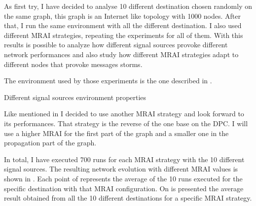 As first try, I have decided to analyse \num{10} different destination chosen randomly
on the same graph, this graph is an Internet like topology with \num{1000} nodes.
After that, I run the same environment with all the different destination.
I also used different \ac{MRAI} strategies, repeating the experiments for all of
them.
With this results is possible to analyze how different signal sources provoke
different network performances and also study how different \ac{MRAI} strategies
adapt to different nodes that provoke messages storms.

The environment used by those experiments is the one described in
.

\begin{table}[h]
	
	\caption{Different signal sources environment properties}
	\label{tbl:source_properties}
\end{table}

Like mentioned in  I decided to use another
\ac{MRAI} strategy and look forward to its performances.
That strategy is the reverse of the one base on the \ac{DPC}.
I will use a higher \ac{MRAI} for the first part of the graph and a smaller
one in the propagation part of the graph.

In total, I have executed \num{700} runs for each \ac{MRAI} strategy with the
\num{10} different signal sources.
The resulting network evolution with different \ac{MRAI} values is shown in
.
Each point of  represents the average
of the \num{10} runs executed for the specific destination with that \ac{MRAI}
configuration.
On  is presented the average result
obtained from all the \num{10} different destinations for a specific \ac{MRAI}
strategy.

